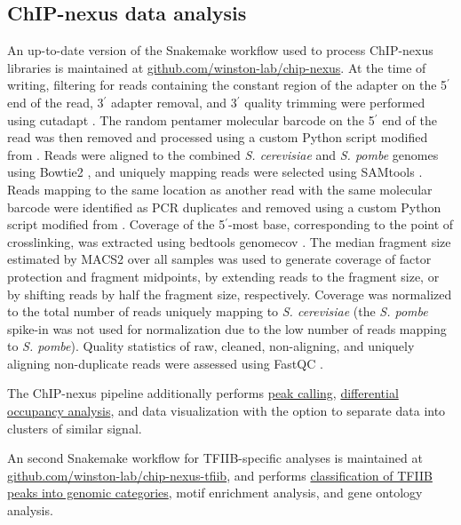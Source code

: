 \subsection{ChIP-nexus data analysis}
An up-to-date version of the Snakemake \citep{koster2012} workflow used to process ChIP-nexus libraries is maintained at \href{https://github.com/winston-lab/chip-nexus}{github.com/winston-lab/chip-nexus}.
At the time of writing, filtering for reads containing the constant region of the adapter on the 5$^\prime$ end of the read, 3$^\prime$ adapter removal, and 3$^\prime$ quality trimming were performed using cutadapt \citep{martin2011}.
The random pentamer molecular barcode on the 5$^\prime$ end of the read was then removed and processed using a custom Python script modified from \citet{mayer2015}.
Reads were aligned to the combined \textit{S. cerevisiae} and \textit{S. pombe} genomes using Bowtie2 \citep{langmead2012}, and uniquely mapping reads were selected using SAMtools \citep{li2009}.
Reads mapping to the same location as another read with the same molecular barcode were identified as PCR duplicates and removed using a custom Python script modified from \citet{mayer2015}.
Coverage of the 5$^\prime$-most base, corresponding to the point of crosslinking, was extracted using bedtools genomecov \citep{quinlan2010}.
The median fragment size estimated by MACS2 \citep{zhang2008} over all samples was used to generate coverage of factor protection and fragment midpoints, by extending reads to the fragment size, or by shifting reads by half the fragment size, respectively.
Coverage was normalized to the total number of reads uniquely mapping to \textit{S. cerevisiae} (the \textit{S. pombe} spike-in was not used for normalization due to the low number of reads mapping to \textit{S. pombe}).
Quality statistics of raw, cleaned, non-aligning, and uniquely aligning non-duplicate reads were assessed using FastQC \cite{andrews2010}.

The ChIP-nexus pipeline additionally performs \hyperref[subsubsec:nexus_peak_calling]{peak calling}, \hyperref[subsubsec:nexus_differential_occupancy]{differential occupancy analysis}, and data visualization with the option to separate data into clusters of similar signal.

An second Snakemake workflow for TFIIB-specific analyses is maintained at\\\href{https://github.com/winston-lab/chip-nexus-tfiib}{github.com/winston-lab/chip-nexus-tfiib}, and performs \hyperref[subsubsec:tfiib_peak_classification]{classification of TFIIB peaks into genomic categories}, motif enrichment analysis, and gene ontology analysis.

